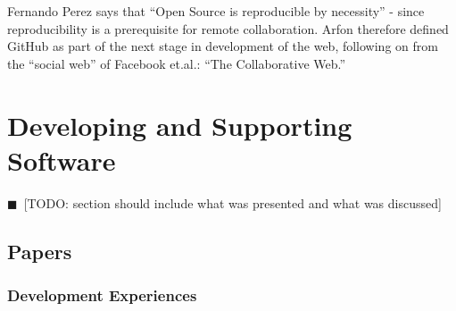 \documentclass[11pt, oneside]{amsart}
\newcommand{\todo}[1]{{\color{blue}$\blacksquare$~\textsf{[TODO: #1]}}}
\begin{document}
Fernando Perez says that ``Open Source
is reproducible by necessity'' - since reproducibility is a prerequisite
for remote collaboration.
Arfon therefore defined GitHub as part of the next stage in development
of the web, following on from the ``social web'' of Facebook et.al.:
``The Collaborative Web.''

\section{Developing and Supporting Software} \label{sec:devel}

\todo{section should include what was presented and what was discussed}

\subsection{Papers}

\subsubsection*{Development Experiences}
\end{document}
